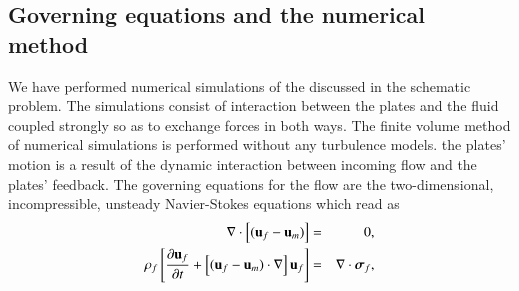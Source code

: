 \documentclass[final,3p,times,authoryear]{elsarticle}
\begin{document}
	\subsection{Governing equations and the numerical method}\label{subsec:maths}
	We have performed numerical simulations of the discussed in the schematic problem. The simulations consist of interaction between the plates and the fluid coupled strongly so as to exchange forces in both ways. The finite volume method of numerical simulations is performed without any turbulence models. the plates' motion is a result of the dynamic interaction between incoming flow and the plates' feedback. The governing equations for the flow are the two-dimensional, incompressible, unsteady Navier-Stokes equations which read as
	\begin{eqnarray}
		\nabla\cdot\left[(\mathbf{u}_f-\mathbf{u}_m)\right] &=& 0, \\
		\rho_f\left[{\partial\mathbf{u}_f\over\partial t}+\left[(\mathbf{u}_f-\mathbf{u}_m)\cdot\mathbf{\nabla}\right]\mathbf{u}_f\right] &=& \mathbf{\nabla}\cdot\mathbf{\boldsymbol{\sigma}}_f,
	\end{eqnarray}
	
\end{document}
